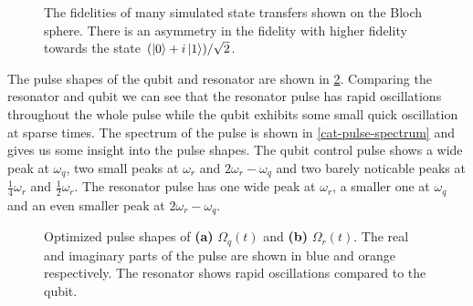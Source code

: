 \documentclass[main.tex]{subfiles}
\begin{document}
\begin{figure}[ht]
	\centering
	\caption{%
	The fidelities of many simulated state transfers shown on the Bloch sphere.
	There is an asymmetry in the fidelity with higher fidelity towards the state \((\ket{0}+i\ket{1})/\sqrt{2}\).
	}%
	\label{fig:bloch-fid}
\end{figure}


The pulse shapes of the qubit and resonator are shown in \cref{fig:cat-pulse-shape}.
Comparing the resonator and qubit we can see that the resonator pulse has rapid oscillations throughout the whole pulse while the qubit exhibits some small quick oscillation at sparse times.
The spectrum of the pulse is shown in \cref{cat-pulse-spectrum} and gives us some insight into the pulse shapes.
The qubit control pulse shows a wide peak at \(\omega_q\), two small peaks at \(\omega_r\) and \(2\omega_r-\omega_q\) and two barely noticable peaks at \(\frac{1}{4}\omega_r\) and \(\frac{1}{2}\omega_r\). 
The resonator pulse has one wide peak at \(\omega_r\), a smaller one at \(\omega_q\) and an even smaller peak at \(2\omega_r-\omega_q\).

\begin{figure}[ht]
\centering
{}
\caption{%
Optimized pulse shapes of \textbf{(a)} \(\Omega_q(t)\) and \textbf{(b)} \(\Omega_r(t)\).
The real and imaginary parts of the pulse are shown in blue and orange respectively.
The resonator shows rapid oscillations compared to the qubit.
}%
\label{fig:cat-pulse-shape}
\end{figure}
\end{document}
